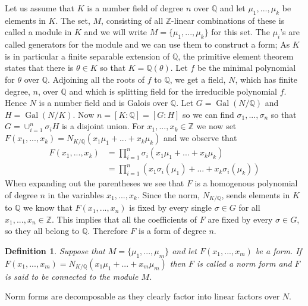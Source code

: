 \documentclass{article}
\DeclareMathOperator{\Gal}{Gal}
\newtheorem{definition}{Definition}[section]
\newcommand{\mbb}[1]{\mathbb{#1}}
\begin{document}

Let us assume that $K$ is a number field of degree $n$ over $\mbb Q$ and let $\mu_1, ..., \mu_k$ be elements in $K$. The set, $M$, consisting of all $\mbb{Z}$-linear combinations of these is called a module in $K$ and we will write $M = \{\mu_1, ..., \mu_k\}$ for this set. The $\mu_i$'s are called generators for the module and we can use them to construct a form; As $K$ is in particular a finite separable extension of $\mbb Q$, the primitive element theorem states that there is $\theta \in K$ so that $K = \mbb Q(\theta)$. Let $f$ be the minimal polynomial for $\theta$ over $\mbb Q$. Adjoining all the roots of $f$ to $\mbb Q$, we get a field, $N$, which has finite degree, $n$, over $\mbb Q$ and which is splitting field for the irreducible polynomial $f$. Hence $N$ is a number field and is Galois over $\mbb Q$. Let $G = \Gal(N / \mbb Q)$ and $H = \Gal(N / K)$. Now $n = [K : \mbb Q] = [G : H]$ so we can find $\sigma_1, ..., \sigma_n$ so that
$G = \cup_{i=1}^n \sigma_i H$
is a disjoint union. For $x_1, ..., x_k \in \mbb Z$ we now set $F(x_1, ..., x_k) = N_{K/\mbb Q}(x_1 \mu_1 + ... + x_k \mu_k)$ and we observe that 
\begin{align*}
    F(x_1, ..., x_k) &= \prod_{i = 1}^n \sigma_i(x_1 \mu_1 + ... + x_k \mu_k)\\ 
    &= \prod_{i = 1}^n \left(x_1 \sigma_i(\mu_1) + ... + x_k \sigma_i(\mu_k) \right)
\end{align*}
When expanding out the parentheses we see that $F$ is a homogenous polynomial of degree $n$ in the variables $x_1, ..., x_k$. Since the norm, $N_{K/\mbb Q}$, sends elements in $K$ to $\mbb Q$ we know that $F(x_1, ..., x_n)$ is fixed by every single $\sigma \in G$ for all $x_1, ..., x_n \in \mbb Z$. This implies that all the coefficients of $F$ are fixed by every $\sigma \in G$, so they all belong to $\mbb Q$. Therefore $F$ is a form of degree $n$. 
\begin{definition}
    Suppose that $M = \{\mu_1, ..., \mu_m\}$ and let $F(x_1,...,x_m)$ be a form. If $F(x_1, ..., x_m) = N_{K / \mbb Q}(x_1 \mu_1 + ... + x_m \mu_m)$ then $F$ is called a norm form and $F$ is said to be connected to the module $M$. 
\end{definition}
Norm forms are decomposable as they clearly factor into linear factors over $N$. 
\end{document}
